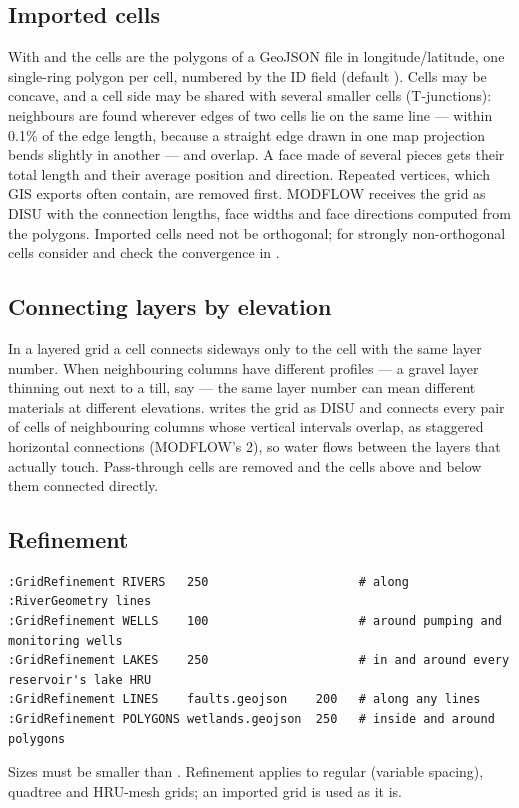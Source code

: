 \subsection{Imported cells}
With  and  the cells are the polygons of a GeoJSON file in
longitude/latitude, one single-ring polygon per cell, numbered by the ID field (default ). Cells may be
concave, and a cell side may be shared with several smaller cells (T-junctions): neighbours are found wherever edges of two
cells lie on the same line --- within 0.1\% of the edge length, because a straight edge drawn in one map projection bends
slightly in another --- and overlap. A face made of several pieces gets their total length and their average position and
direction. Repeated vertices, which GIS exports often contain, are removed first. MODFLOW receives the grid as DISU with the
connection lengths, face widths and face directions computed from the polygons. Imported cells need not be orthogonal; for strongly non-orthogonal cells consider
 and check the convergence in .

\subsection{Connecting layers by elevation}
In a layered grid a cell connects sideways only to the cell with the same layer number. When neighbouring columns have
different profiles --- a gravel layer thinning out next to a till, say --- the same layer number can mean different
materials at different elevations.  writes the grid as DISU and connects every pair of
cells of neighbouring columns whose vertical intervals overlap, as staggered horizontal connections (MODFLOW's 
2), so water flows between the layers that actually touch. Pass-through cells are removed and the cells above and below
them connected directly.

\subsection{Refinement}
\begin{lstlisting}
:GridRefinement RIVERS   250                     # along :RiverGeometry lines
:GridRefinement WELLS    100                     # around pumping and monitoring wells
:GridRefinement LAKES    250                     # in and around every reservoir's lake HRU
:GridRefinement LINES    faults.geojson    200   # along any lines
:GridRefinement POLYGONS wetlands.geojson  250   # inside and around polygons
\end{lstlisting}
Sizes must be smaller than . Refinement applies to regular (variable spacing), quadtree and HRU-mesh
grids; an imported grid is used as it is.

